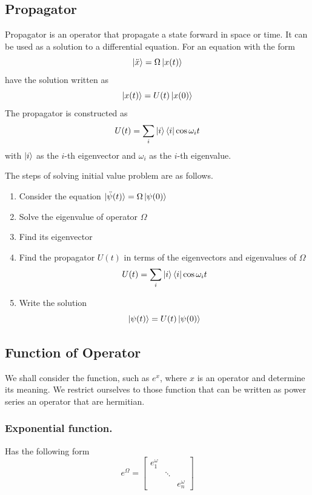 \documentclass[../../../main.tex]{subfiles}
\begin{document}
\subsection{Propagator}
Propagator is an operator that propagate a state forward in space or time.
It can be used as a solution to a differential equation.
For an equation with the form
\begin{equation*}
	\ket{\ddot{x}}=\Omega \ket{x(t)}
\end{equation*}
have the solution written as
\begin{equation*}
	\ket{x(t)}=U(t)\ket{x(0)}
\end{equation*}
The propagator is constructed as
\begin{equation*}
	U(t)= \sum_i\ket{i} \bra{i}\cos \omega_i t
\end{equation*}
with $\ket{i }$ as the $i$-th eigenvector and $\omega_i$ as the $i$-th eigenvalue.

The steps of solving initial value problem are as follows.
\begin{enumerate}
	\item Consider the equation $\ket{\ddot{\psi}(t)}=\Omega\ket{\psi(0)}$
	\item Solve the eigenvalue of operator $\Omega$
	\item Find its eigenvector
	\item Find the propagator $U(t)$ in terms of the eigenvectors and eigenvalues
	      of $\Omega$
	      \begin{equation*}
		      U(t)= \sum_i\ket{i} \bra{i}\cos \omega_i t
	      \end{equation*}
	\item Write the solution
	      \begin{equation*}
		      \ket{\psi(t)}=U(t)\ket{\psi(0)}
	      \end{equation*}
\end{enumerate}

\subsection{Function of Operator}
We shall consider the function, such as $e^x$, where $x$ is an operator and determine its meaning.
We restrict ourselves to those function that can be written as power series an operator that are hermitian.

\subsubsection{Exponential function.}
Has the following form
\begin{equation*}
	e^\Omega=
	\begin{bmatrix}
		e^\omega_1 &        &            \\
		           & \ddots &            \\
		           &        & e^\omega_n
	\end{bmatrix}
\end{equation*}
\end{document}
